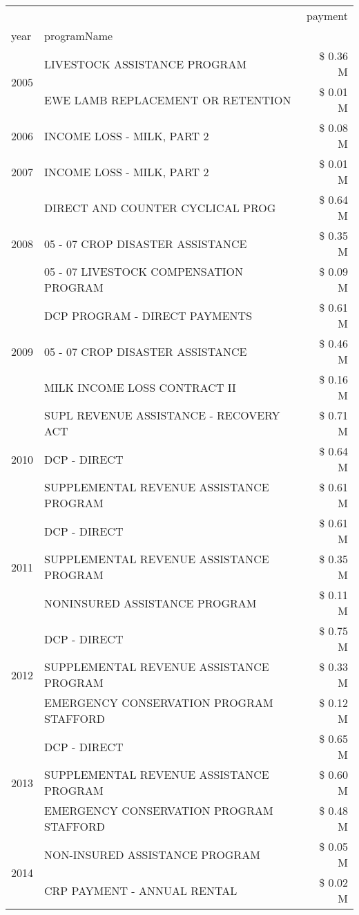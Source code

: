 \begin{tabular}{llr}
\toprule
 &  & payment \\
year & programName &  \\
\midrule
\multirow[t]{2}{*}{2005} & LIVESTOCK ASSISTANCE PROGRAM & \$ 0.36 M \\
 & EWE LAMB REPLACEMENT OR RETENTION & \$ 0.01 M \\
\cline{1-3}
2006 & INCOME LOSS - MILK, PART 2 & \$ 0.08 M \\
\cline{1-3}
2007 & INCOME LOSS - MILK, PART 2 & \$ 0.01 M \\
\cline{1-3}
\multirow[t]{3}{*}{2008} & DIRECT AND COUNTER CYCLICAL PROG & \$ 0.64 M \\
 & 05 - 07 CROP DISASTER ASSISTANCE & \$ 0.35 M \\
 & 05 - 07 LIVESTOCK COMPENSATION PROGRAM & \$ 0.09 M \\
\cline{1-3}
\multirow[t]{3}{*}{2009} & DCP PROGRAM - DIRECT PAYMENTS & \$ 0.61 M \\
 & 05 - 07 CROP DISASTER ASSISTANCE & \$ 0.46 M \\
 & MILK INCOME LOSS CONTRACT II & \$ 0.16 M \\
\cline{1-3}
\multirow[t]{3}{*}{2010} & SUPL REVENUE ASSISTANCE - RECOVERY ACT & \$ 0.71 M \\
 & DCP - DIRECT & \$ 0.64 M \\
 & SUPPLEMENTAL REVENUE ASSISTANCE PROGRAM & \$ 0.61 M \\
\cline{1-3}
\multirow[t]{3}{*}{2011} & DCP - DIRECT & \$ 0.61 M \\
 & SUPPLEMENTAL REVENUE ASSISTANCE PROGRAM & \$ 0.35 M \\
 & NONINSURED ASSISTANCE PROGRAM & \$ 0.11 M \\
\cline{1-3}
\multirow[t]{3}{*}{2012} & DCP - DIRECT & \$ 0.75 M \\
 & SUPPLEMENTAL REVENUE ASSISTANCE PROGRAM & \$ 0.33 M \\
 & EMERGENCY CONSERVATION PROGRAM STAFFORD & \$ 0.12 M \\
\cline{1-3}
\multirow[t]{3}{*}{2013} & DCP - DIRECT & \$ 0.65 M \\
 & SUPPLEMENTAL REVENUE ASSISTANCE PROGRAM & \$ 0.60 M \\
 & EMERGENCY CONSERVATION PROGRAM STAFFORD & \$ 0.48 M \\
\cline{1-3}
\multirow[t]{3}{*}{2014} & NON-INSURED ASSISTANCE PROGRAM & \$ 0.05 M \\
 & CRP PAYMENT - ANNUAL RENTAL & \$ 0.02 M \\

\end{tabular}
